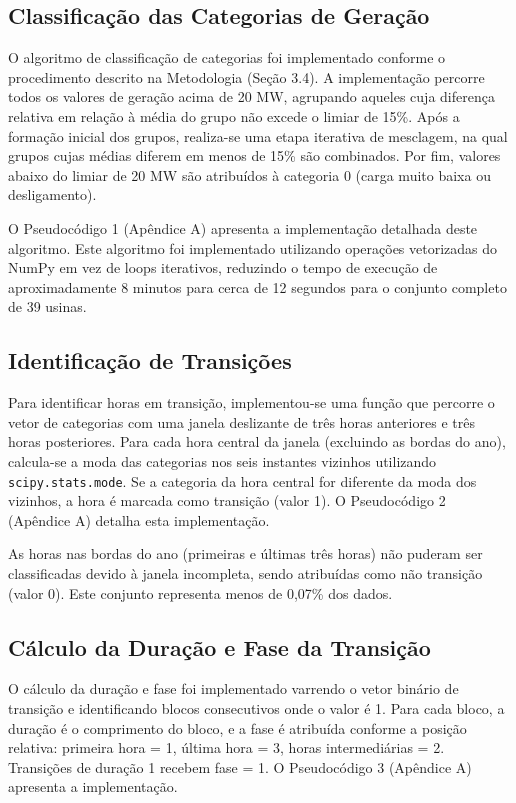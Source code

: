\subsection{Classificação das Categorias de Geração}

O algoritmo de classificação de categorias foi implementado conforme o procedimento descrito na Metodologia (Seção 3.4). A implementação percorre todos os valores de geração acima de 20 MW, agrupando aqueles cuja diferença relativa em relação à média do grupo não excede o limiar de 15\%. Após a formação inicial dos grupos, realiza-se uma etapa iterativa de mesclagem, na qual grupos cujas médias diferem em menos de 15\% são combinados. Por fim, valores abaixo do limiar de 20 MW são atribuídos à categoria 0 (carga muito baixa ou desligamento).

O Pseudocódigo 1 (Apêndice A) apresenta a implementação detalhada deste algoritmo. Este algoritmo foi implementado utilizando operações vetorizadas do NumPy em vez de loops iterativos, reduzindo o tempo de execução de aproximadamente 8 minutos para cerca de 12 segundos para o conjunto completo de 39 usinas.

\subsection{Identificação de Transições}

Para identificar horas em transição, implementou-se uma função que percorre o vetor de categorias com uma janela deslizante de três horas anteriores e três horas posteriores. Para cada hora central da janela (excluindo as bordas do ano), calcula-se a moda das categorias nos seis instantes vizinhos utilizando \texttt{scipy.stats.mode}. Se a categoria da hora central for diferente da moda dos vizinhos, a hora é marcada como transição (valor 1). O Pseudocódigo 2 (Apêndice A) detalha esta implementação.

As horas nas bordas do ano (primeiras e últimas três horas) não puderam ser classificadas devido à janela incompleta, sendo atribuídas como não transição (valor 0). Este conjunto representa menos de 0,07\% dos dados.

\subsection{Cálculo da Duração e Fase da Transição}

O cálculo da duração e fase foi implementado varrendo o vetor binário de transição e identificando blocos consecutivos onde o valor é 1. Para cada bloco, a duração é o comprimento do bloco, e a fase é atribuída conforme a posição relativa: primeira hora = 1, última hora = 3, horas intermediárias = 2. Transições de duração 1 recebem fase = 1. O Pseudocódigo 3 (Apêndice A) apresenta a implementação.

